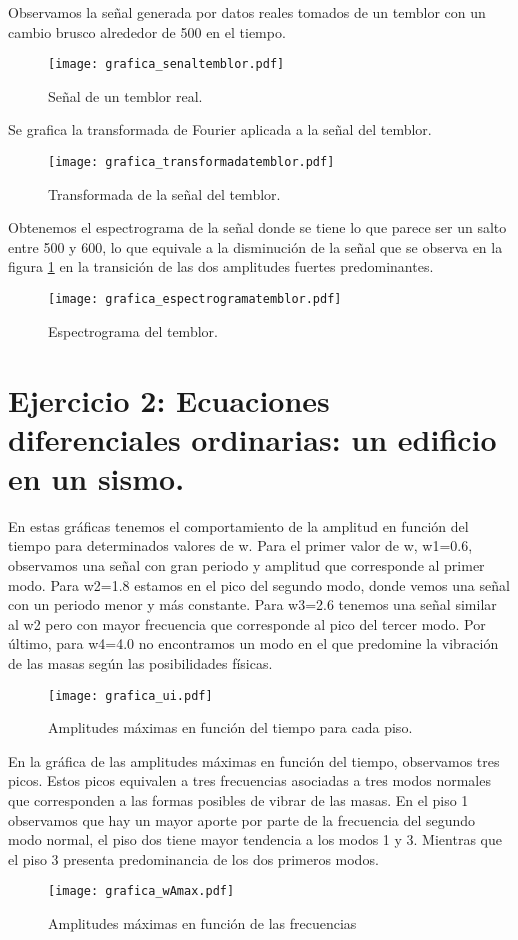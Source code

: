 \documentclass[11pt,letterpaper]{exam}
\begin{document}
Observamos la señal generada por datos reales tomados de un temblor con un cambio brusco alrededor de 500 en el tiempo. \\
\begin{figure}[H]
\centering
\texttt{[image: grafica\_senaltemblor.pdf]}
\caption{Señal de un temblor real.}
\label{fig4}
\end{figure}

Se grafica la transformada de Fourier aplicada a la señal del temblor.\\
\begin{figure}[H]
\centering
\texttt{[image: grafica\_transformadatemblor.pdf]}
\caption{Transformada de la señal del temblor.}
\label{fig5}
\end{figure}

Obtenemos el espectrograma de la señal donde se tiene lo que parece ser un salto entre 500 y 600, lo que equivale a la disminución de la señal que se observa en la figura \ref{fig4} en la transición de las dos amplitudes fuertes predominantes. \\
\begin{figure}[H]
\centering
\texttt{[image: grafica\_espectrogramatemblor.pdf]}
\caption{Espectrograma del temblor.}
\label{fig6}
\end{figure}

\noindent
\section{Ejercicio 2: Ecuaciones diferenciales ordinarias: un edificio en un sismo.}

En estas gráficas tenemos el comportamiento de la amplitud en función del tiempo para determinados valores de w. Para el primer valor de w, w1=0.6, observamos una señal con gran periodo y amplitud que corresponde al primer modo. Para w2=1.8 estamos en el pico del segundo modo, donde vemos una señal con un periodo menor y más constante. Para w3=2.6 tenemos una señal similar al w2 pero con mayor frecuencia que corresponde al pico del tercer modo. Por último, para w4=4.0 no encontramos un modo en el que predomine la vibración de las masas  según las posibilidades físicas.\\
\begin{figure}[H]
\centering
\texttt{[image: grafica\_ui.pdf]}
\caption{Amplitudes máximas en función del tiempo para cada piso.}
\label{fig7}
\end{figure}

En la gráfica de las amplitudes máximas en función del tiempo, observamos tres picos. Estos picos equivalen a tres frecuencias asociadas a tres modos normales que corresponden a las formas posibles de vibrar de las masas. En el piso 1 observamos que hay un mayor aporte por parte de la frecuencia del segundo modo normal, el piso dos tiene mayor tendencia a los modos 1 y 3. Mientras que el piso 3 presenta predominancia de los dos primeros modos. \\
\begin{figure}[H]
\centering
\texttt{[image: grafica\_wAmax.pdf]}
\caption{Amplitudes máximas en función de las frecuencias}
\label{fig8}
\end{figure}
\end{document}
